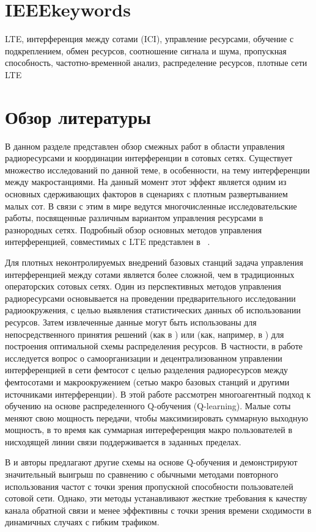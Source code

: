 \section{IEEEkeywords}
LTE, интерференция между сотами (ICI), управление ресурсами, обучение с подкреплением, обмен ресурсов, соотношение сигнала и шума, пропускная способность, частотно-временной анализ, распределение ресурсов, плотные сети LTE

\section{Обзор литературы}


В данном разделе представлен обзор смежных работ в области управления радиоресурсами и координации интерференции в сотовых сетях. Существует множество исследований по данной теме, в особенности, на тему интерференции между макростанциями. На данный момент этот эффект является одним из основных сдерживающих факторов в сценариях с плотным развертыванием малых сот. В связи с этим в мире ведутся многочисленные исследовательские работы, посвященные различным вариантом управления ресурсами в разнородных сетях. Подробный обзор основных методов управления интерференцией, совместимых с LTE представлен в ~\cite{cite_overview}.

Для плотных неконтролируемых внедрений базовых станций задача управления интерференцией между сотами является более сложной, чем в традиционных операторских сотовых сетях. Один из перспективных методов управления радиоресурсами основывается на проведении предварительного исследовании радиоокружения, с целью выявления статистических данных об использовании ресурсов. Затем извлеченные данные могут быть использованы для непосредственного принятия решений (как в \cite{mab}) или (как, например, в \cite{q-learning}) для построения оптимальной схемы распределения ресурсов. В частности, в работе~\cite{q-learning} исследуется вопрос о самоорганизации и децентрализованном управлении интерференцией в сети фемтосот с целью разделения радиоресурсов между фемтосотами и макроокружением (сетью макро базовых станций и другими источниками интерференции). В этой работе рассмотрен многоагентный подход к обучению на основе распределенного Q-обучения (Q-learning). Малые соты меняют свою мощность передачи, чтобы максимизировать суммарную выходную мощность, в то время как суммарная интереференция макро пользователей в нисходящей линии связи поддерживается в заданных пределах.

В \cite{mp-qlearning} и \cite{fzq-learning} авторы предлагают другие схемы на основе Q-обучения и демонстрируют значительный выигрыш по сравнению с обычными методами повторного использования частот с точки зрения пропускной способности пользователей сотовой сети. Однако, эти методы устанавливают жесткие требования к качеству канала обратной связи и менее эффективны с точки зрения времени сходимости в динамичных случаях с гибким трафиком. 

